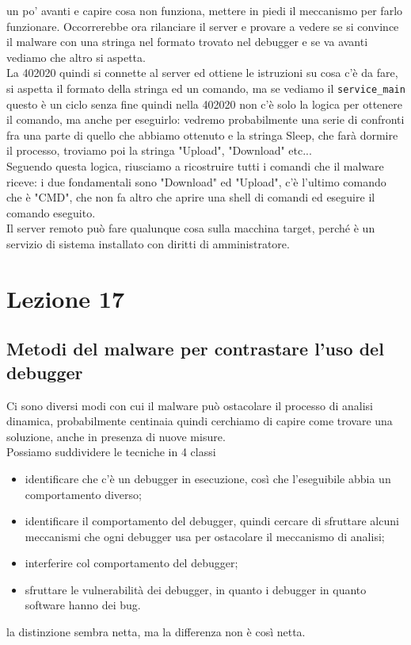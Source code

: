 \documentclass[12pt, oneside]{extbook}
\begin{document}
un po' avanti e capire cosa non funziona, mettere in piedi il meccanismo per farlo funzionare. Occorrerebbe ora rilanciare il server e provare a vedere se si convince il malware con una stringa nel formato trovato nel debugger e se va avanti vediamo che altro si aspetta.\\La 402020 quindi si connette al server ed ottiene le istruzioni su cosa c'è da fare, si aspetta il formato della stringa ed un comando, ma se vediamo il \texttt{service\_main} questo è un ciclo senza fine quindi nella 402020 non c'è solo la logica per ottenere il comando, ma anche per eseguirlo: vedremo probabilmente una serie di confronti fra una parte di quello che abbiamo ottenuto e la stringa Sleep, che farà dormire il processo, troviamo poi la stringa "Upload", "Download" etc...\\Seguendo questa logica, riusciamo a ricostruire tutti i comandi che il malware riceve: i due fondamentali sono "Download" ed "Upload", c'è l'ultimo comando che è "CMD", che non fa altro che aprire una shell di comandi ed eseguire il comando eseguito.\\Il server remoto può fare qualunque cosa sulla macchina target, perché è un servizio di sistema installato con diritti di amministratore.
\chapter{Lezione 17}
\section{Metodi del malware per contrastare l'uso del debugger}
Ci sono diversi modi con cui il malware può ostacolare il processo di analisi dinamica, probabilmente centinaia quindi cerchiamo di capire come trovare una soluzione, anche in presenza di nuove misure.\\Possiamo suddividere le tecniche in 4 classi
\begin{itemize}
\item identificare che c'è un debugger in esecuzione, così che l'eseguibile abbia un comportamento diverso;
\item identificare il comportamento del debugger, quindi cercare di sfruttare alcuni meccanismi che ogni debugger usa per ostacolare il meccanismo di analisi;
\item interferire col comportamento del debugger;
\item sfruttare le vulnerabilità dei debugger, in quanto i debugger in quanto software hanno dei bug.
\end{itemize}
la distinzione sembra netta, ma la differenza non è così netta.
\end{document}
